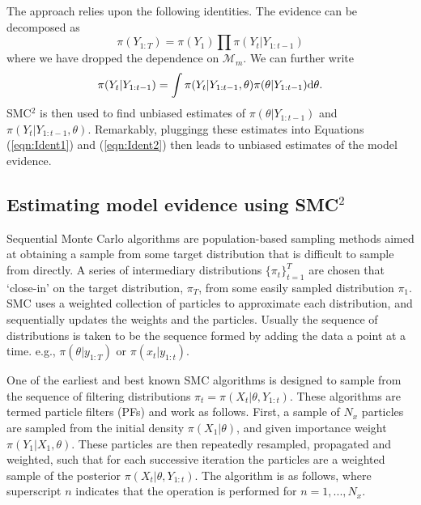 \documentclass[a4paper,12pt]{article}
\newcommand{\rdw}[1]{\par\medskip\noindent\fbox{\parbox{\textwidth}{\textbf{Comment by Rich}: #1 }}\medskip}
\begin{document}
The approach relies upon the following identities. The evidence can be decomposed as
\begin{equation}\label{eqn:Ident1}
\pi(Y_{1:T}) =\pi(Y_1) \prod \pi(Y_t | Y_{1:t-1})
\end{equation}
where we have dropped the dependence on $\mathcal{M}_m$.
We can further write 
\begin{equation}\label{eqn:Ident2}
\pi(Y_t | Y_{1:t-1}) = \int \pi(Y_t | Y_{1:t-1}, \theta) \pi(\theta | Y_{1:t-1}) {\rm d} \theta.
\end{equation}
SMC$^2$ is then used to find unbiased estimates of $\pi(\theta | Y_{1:t-1})$ and $ \pi(Y_t | Y_{1:t-1}, \theta)$. Remarkably, pluggingg these estimates into Equations (\ref{eqn:Ident1}) and (\ref{eqn:Ident2}) then leads to unbiased estimates of the model evidence.



\rdw{ UPPER OR LOWER CASE Y?}


\subsection{Estimating model evidence using SMC$^2$}

Sequential Monte Carlo algorithms \cite{DelMoral2006} are population-based sampling methods aimed at obtaining a sample from some target distribution that is difficult to sample from directly.
A series of intermediary distributions $\{ \pi_t \}_{t=1}^T$ are chosen that `close-in' on the target distribution, $\pi_T$, from some easily sampled distribution $\pi_1$. SMC uses a weighted collection of particles to approximate each distribution, and sequentially updates the weights and the particles.
Usually the sequence of distributions is taken to be the sequence formed by adding the data a point at a time. e.g., $\pi(\theta |y_{1:T})$ or $\pi(x_{t}|y_{1:t})$.

One of the earliest and best known SMC algorithms \cite{Gordon1993} is designed  to sample from the sequence of filtering distributions $\pi_t = \pi(X_t \vert \theta, Y_{1:t})$. These algorithms are termed particle filters (PFs) and work as follows.
First, a sample of $N_x$ particles are sampled from the initial density $\pi (X_1 \vert \theta)$, and given importance weight $\pi (Y_1 \vert X_1, \theta)$.
These particles are then repeatedly resampled, propagated and weighted, such that for each successive iteration the particles are a weighted sample of the posterior $\pi(X_t \vert \theta, Y_{1:t})$.
The algorithm is as follows, where superscript $n$ indicates that the operation is performed for  $n = 1,...,N_x$.
\end{document}
